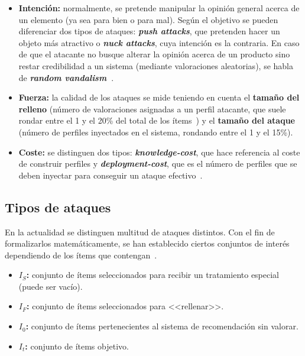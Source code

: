 \begin{itemize}
	
	\item \textbf{Intención:} normalmente, se pretende manipular la opinión general acerca de un elemento (ya sea para bien o para mal). Según el objetivo se pueden diferenciar dos tipos de ataques: \textbf{\textit{push attacks}}, que pretenden hacer un objeto más atractivo o \textbf{\textit{nuck attacks}}, cuya intención es la contraria. En caso de que el atacante no busque alterar la opinión acerca de un producto sino restar credibilidad a un sistema (mediante valoraciones aleatorias), se habla de \textbf{\textit{random vandalism}~\cite{Burke2015RobustCollaborative}}.
	
	\item \textbf{Fuerza:} la calidad de los ataques se mide teniendo en cuenta el \textbf{tamaño del relleno} (número de valoraciones asignadas a un perfil atacante, que suele rondar entre el 1 y el 20\% del total de los ítems~\cite{mingdan2018ShillingAttacksAReview}) y el \textbf{tamaño del ataque} (número de perfiles inyectados en el sistema, rondando entre el 1 y el 15\%).
	
	\item \textbf{Coste:} se distinguen dos tipos: \textbf{\textit{knowledge-cost}}, que hace referencia al coste de construir perfiles y \textbf{\textit{deployment-cost}}, que es el número de perfiles que se deben inyectar para conseguir un ataque efectivo~\cite{Mobasher2006Thesis}.
	
\end{itemize}
		
\subsection{Tipos de ataques}

En la actualidad se distinguen multitud de ataques distintos. Con el fin de formalizarlos matemáticamente, se han establecido ciertos conjuntos de interés dependiendo de los ítems que contengan~\cite{zhou2021SemisupervisedRecommendationAttack}.

\begin{itemize}
	
	\item \textbf{$I_S$:} conjunto de ítems seleccionados para recibir un tratamiento especial (puede ser vacío).
	\item \textbf{$I_F$:} conjunto de ítems seleccionados para <<rellenar>>.
	\item \textbf{$I_0$:} conjunto de ítems pertenecientes al sistema de recomendación sin valorar.
	\item \textbf{$I_t$:} conjunto de ítems objetivo.
	
\end{itemize}


